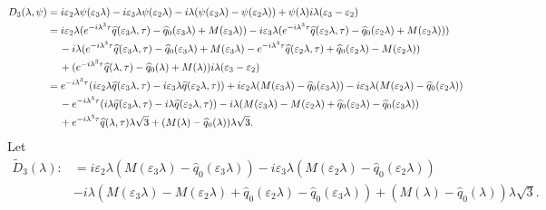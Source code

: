\begin{align*}
    D_3(\lambda, \psi) &= i \varepsilon_2\lambda \psi(\varepsilon_3\lambda)-i \varepsilon_3\lambda \psi(\varepsilon_2\lambda) - i\lambda(\psi(\varepsilon_3\lambda) - \psi(\varepsilon_2 \lambda)) + \psi(\lambda) i \lambda (\varepsilon_3 - \varepsilon_2) \\
    &=i \varepsilon_2\lambda (e^{-i \lambda^3 \tau}\widehat{q}(\varepsilon_3\lambda,\tau) - \widehat{q}_0(\varepsilon_3\lambda) + M(\varepsilon_3\lambda)) -i \varepsilon_3\lambda (e^{-i \lambda^3 \tau}\widehat{q}(\varepsilon_2\lambda,\tau) - \widehat{q}_0(\varepsilon_2\lambda) + M(\varepsilon_2\lambda))) \\
    &\hspace{1pc}- i\lambda(e^{-i \lambda^3 \tau}\widehat{q}(\varepsilon_3\lambda,\tau) - \widehat{q}_0(\varepsilon_3\lambda) + M(\varepsilon_3\lambda) - e^{-i \lambda^3 \tau}\widehat{q}(\varepsilon_2\lambda,\tau) + \widehat{q}_0(\varepsilon_2\lambda) - M(\varepsilon_2\lambda)) \\
    &\hspace{1pc}+ (e^{-i \lambda^3 \tau}\widehat{q}(\lambda,\tau) - \widehat{q}_0(\lambda) + M(\lambda))i \lambda (\varepsilon_3 - \varepsilon_2) \\
    &=e^{-i \lambda^3 \tau}(i \varepsilon_2\lambda \widehat{q}(\varepsilon_3\lambda,\tau)  -i \varepsilon_3\lambda\widehat{q}(\varepsilon_2\lambda,\tau)) +i \varepsilon_2\lambda (M(\varepsilon_3\lambda) - \widehat{q}_0(\varepsilon_3\lambda))-i \varepsilon_3\lambda( M(\varepsilon_2\lambda)- \widehat{q}_0(\varepsilon_2\lambda)) \\
    &\hspace{1pc}- e^{-i \lambda^3 \tau}( i\lambda\widehat{q}(\varepsilon_3\lambda,\tau) -  i\lambda\widehat{q}(\varepsilon_2\lambda,\tau))  - i\lambda(M(\varepsilon_3\lambda)   - M(\varepsilon_2\lambda) + \widehat{q}_0(\varepsilon_2\lambda) - \widehat{q}_0(\varepsilon_3\lambda)) \\
    &\hspace{1pc}+ e^{-i \lambda^3 \tau}\widehat{q}(\lambda,\tau)\lambda \sqrt{3} + (M(\lambda) - \widehat{q}_0(\lambda)) \lambda \sqrt{3}.
\end{align*}
Let 
\begin{align*}
    \widetilde{D}_3(\lambda) :&= i \varepsilon_2\lambda (M(\varepsilon_3\lambda) - \widehat{q}_0(\varepsilon_3\lambda))-i \varepsilon_3\lambda( M(\varepsilon_2\lambda)- \widehat{q}_0(\varepsilon_2\lambda)) \\
    &- i\lambda(M(\varepsilon_3\lambda)   - M(\varepsilon_2\lambda) + \widehat{q}_0(\varepsilon_2\lambda) - \widehat{q}_0(\varepsilon_3\lambda)) + (M(\lambda) - \widehat{q}_0(\lambda)) \lambda \sqrt{3}.
\end{align*}
